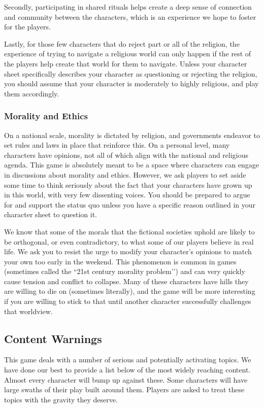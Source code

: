 \documentclass[sheet]{GL2020}
\begin{document}
Secondly, participating in shared rituals helps create a deep sense of connection and community between the characters, which is an experience we hope to foster for the players. 

Lastly, for those few characters that do reject part or all of the religion, the experience of trying to navigate a religious world can only happen if the rest of the players help create that world for them to navigate. Unless your character sheet specifically describes your character as questioning or rejecting the religion, you should assume that your character is moderately to highly religious, and play them accordingly. 

\subsubsection{Morality and Ethics}
On a national scale, morality is dictated by religion, and governments endeavor to set rules and laws in place that reinforce this. On a personal level, many characters have opinions, not all of which align with the national and religious agenda. This game is absolutely meant to be a space where characters can engage in discussions about morality and ethics. However, we ask players to set aside some time to think seriously about the fact that your characters have grown up in this world, with very few dissenting voices. You should be prepared to argue for and support the status quo unless you have a specific reason outlined in your character sheet to question it.

We know that some of the morals that the fictional societies uphold are likely to be orthogonal, or even contradictory, to what some of our players believe in real life. We ask you to resist the urge to modify your character’s opinions to match your own too early in the weekend. This phenomenon is common in games (sometimes called the ``21st century morality problem’’) and can very quickly cause tension and conflict to collapse. Many of these characters have hills they are willing to die on (sometimes literally), and the game will be more interesting if you are willing to stick to that until another character successfully challenges that worldview. 

\subsection{Content Warnings}
This game deals with a number of serious and potentially activating topics. We have done our best to provide a list below of the most widely reaching content. Almost every character will bump up against these. Some characters will have large swaths of their play built around them. Players are asked to treat these topics with the gravity they deserve.
\end{document}
